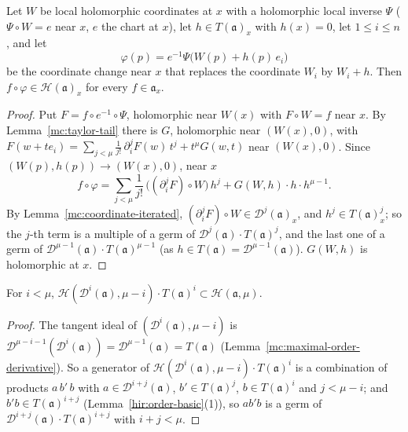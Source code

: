 \begin{lemma}
\label{mc:glueing-inclusion}
\leanok
Let \(W\) be local holomorphic coordinates at \(x\) with a holomorphic local inverse \(\Psi\) (\(\Psi\circ W=e\) near \(x\), \(e\) the chart at
\(x\)), let \(h\in T(\mathfrak a)_x\) with \(h(x)=0\), let \(1\le i\le n\), and let
\[
 \varphi(p)=e^{-1}\Psi\bigl(W(p)+h(p)\,e_i\bigr)
\]
be the coordinate change near \(x\) that replaces the coordinate \(W_i\) by \(W_i+h\). Then \(f\circ\varphi\in\mathcal H(\mathfrak a)_x\) for every
\(f\in\mathfrak a_x\).
\end{lemma}
\begin{proof}
\leanok
Put \(F=f\circ e^{-1}\circ\Psi\), holomorphic near \(W(x)\) with \(F\circ W=f\) near \(x\). By Lemma~\ref{mc:taylor-tail} there is \(G\), holomorphic near
\((W(x),0)\), with \(F(w+te_i)=\sum_{j<\mu}\frac1{j!}\,\partial_i^jF(w)\,t^j+t^\mu G(w,t)\) near \((W(x),0)\). Since \((W(p),h(p))\to(W(x),0)\), near \(x\)
\[
 f\circ\varphi=\sum_{j<\mu}\frac1{j!}\,\bigl((\partial_i^jF)\circ W\bigr)\,h^j+G(W,h)\cdot h\cdot h^{\mu-1}.
\]
By Lemma~\ref{mc:coordinate-iterated}, \((\partial_i^jF)\circ W\in\mathcal D^j(\mathfrak a)_x\), and \(h^j\in T(\mathfrak a)^j_x\); so the \(j\)-th term is a multiple of a germ of
\(\mathcal D^j(\mathfrak a)\cdot T(\mathfrak a)^j\), and the last one of a germ of \(\mathcal D^{\mu-1}(\mathfrak a)\cdot T(\mathfrak a)^{\mu-1}\) (as \(h\in T(\mathfrak a)=\mathcal D^{\mu-1}(\mathfrak a)\)).
\(G(W,h)\) is holomorphic at \(x\).
\end{proof}
\begin{lemma}
\label{mc:homogenized-product}
\leanok
For \(i<\mu\), \(\mathcal H(\mathcal D^i(\mathfrak a),\mu-i)\cdot T(\mathfrak a)^i\subset\mathcal H(\mathfrak a,\mu)\).
\end{lemma}
\begin{proof}
\leanok
The tangent ideal of \((\mathcal D^i(\mathfrak a),\mu-i)\) is \(\mathcal D^{\mu-i-1}(\mathcal D^i(\mathfrak a))=\mathcal D^{\mu-1}(\mathfrak a)=T(\mathfrak a)\)
(Lemma~\ref{mc:maximal-order-derivative}). So a generator of \(\mathcal H(\mathcal D^i(\mathfrak a),\mu-i)\cdot T(\mathfrak a)^i\) is a combination of products
\(a\,b'\,b\) with \(a\in\mathcal D^{i+j}(\mathfrak a)\), \(b'\in T(\mathfrak a)^j\), \(b\in T(\mathfrak a)^i\) and \(j<\mu-i\); and \(b'b\in T(\mathfrak a)^{i+j}\)
(Lemma~\ref{hir:order-basic}(1)), so \(ab'b\) is a germ of \(\mathcal D^{i+j}(\mathfrak a)\cdot T(\mathfrak a)^{i+j}\) with \(i+j<\mu\).
\end{proof}

